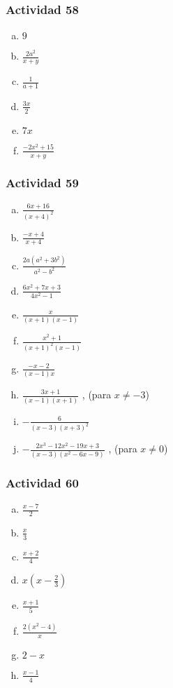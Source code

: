 \documentclass[a4paper, twocolumn]{article}
\begin{document}
\subsubsection*{Actividad 58}
\begin{enumerate}[a)]
\item $9$
\item $\frac{2a^2}{x+y}$
\item $\frac{1}{a+1}$
\item $\frac{3x}{2}$
\item $7x$
\item $\frac{-2x^2 + 15}{x+y}$
\end{enumerate}

\subsubsection*{Actividad 59}
\begin{enumerate}[a)]
\item $\frac{6x+16}{(x+4)^2}$
\item $\frac{-x+4}{x+4}$
\item $\frac{2a(a^2+3b^2)}{a^2 - b^2}$
\item $\frac{6x^2+7x+3}{4x^2-1}$
\item $\frac{x}{(x+1)(x-1)}$
\item $\frac{x^2 + 1}{(x+1)^2(x-1)}$
\item $\frac{-x-2}{(x-1)x}$
\item $\frac{3x+1}{(x-1)(x+1)}$ , (para $x \neq -3$)
\item $-\frac{6}{(x-3)(x+3)^2}$
\item $-\frac{2x^3-12x^2-19x+3}{(x-3)(x^2-6x-9)}$ , (para $x \neq 0$)	
\end{enumerate}

\subsubsection*{Actividad 60}
\begin{enumerate}[a)]
\item $\frac{x-7}{2}$
\item $\frac{x}{3}$
\item $\frac{x+2}{4}$
\item $x(x-\frac{2}{3})$
\item $\frac{x+1}{5}$
\item $\frac{2(x^2-4)}{x}$
\item $2-x$
\item $\frac{x-1}{4}$
\end{enumerate}
\end{document}
